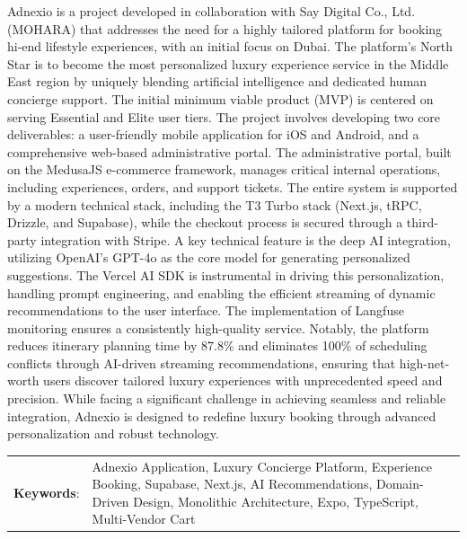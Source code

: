 \abstract

Adnexio is a project developed in collaboration with Say Digital Co., Ltd. (MOHARA) that addresses the need for a highly tailored platform for booking hi-end lifestyle experiences, with an initial focus on Dubai. The platform’s North Star is to become the most personalized luxury experience service in the Middle East region by uniquely blending artificial intelligence and dedicated human concierge support. The initial minimum viable product (MVP) is centered on serving Essential and Elite user tiers.
The project involves developing two core deliverables: a user-friendly mobile application for iOS and Android, and a comprehensive web-based administrative portal. The administrative portal, built on the MedusaJS e-commerce framework, manages critical internal operations, including experiences, orders, and support tickets. The entire system is supported by a modern technical stack, including the T3 Turbo stack (Next.js, tRPC, Drizzle, and Supabase), while the checkout process is secured through a third-party integration with Stripe.
A key technical feature is the deep AI integration, utilizing OpenAI's GPT-4o as the core model for generating personalized suggestions. The Vercel AI SDK is instrumental in driving this personalization, handling prompt engineering, and enabling the efficient streaming of dynamic recommendations to the user interface. The implementation of Langfuse monitoring ensures a consistently high-quality service. Notably, the platform reduces itinerary planning time by 87.8\% and eliminates 100\% of scheduling conflicts through AI-driven streaming recommendations, ensuring that high-net-worth users discover tailored luxury experiences with unprecedented speed and precision. While facing a significant challenge in achieving seamless and reliable integration, Adnexio is designed to redefine luxury booking through advanced personalization and robust technology.

\begin{flushleft}
\begin{tabular*}{\textwidth}{@{}lp{}}
\textbf{Keywords}: & Adnexio Application, Luxury Concierge Platform, Experience Booking, Supabase, 
Next.js,  AI Recommendations, Domain-Driven Design, Monolithic Architecture, 
Expo, TypeScript, Multi-Vendor Cart

\end{tabular*}
\end{flushleft}
\endabstract
